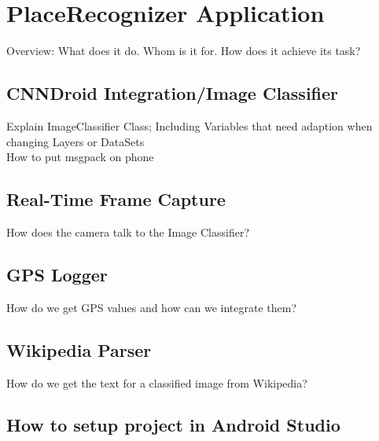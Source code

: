 \section {PlaceRecognizer Application}
Overview: What does it do. Whom is it for. How does it achieve its task?

\subsection {CNNDroid Integration/Image Classifier}
Explain ImageClassifier Class; Including Variables that need adaption when changing Layers or DataSets\\
How to put msgpack on phone

\subsection {Real-Time Frame Capture}
How does the camera talk to the Image Classifier?

\subsection {GPS Logger}
How do we get GPS values and how can we integrate them?

\subsection {Wikipedia Parser}
How do we get the text for a classified image from Wikipedia?

\subsection{How to setup project in Android Studio}